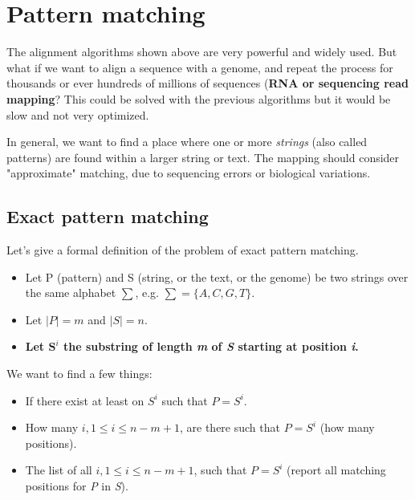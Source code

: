 \documentclass[../main.tex]{subfiles}
\begin{document}
\section{Pattern matching}

The alignment algorithms shown above are very powerful and widely used. But what if we want to align a sequence with a genome, and repeat the process for thousands or ever hundreds of millions of sequences (\textbf{RNA or sequencing read mapping}? This could be solved with the previous algorithms but it would be slow and not very optimized.

In general, we want to find a place where one or more \emph{strings} (also called patterns) are found within a larger string or text. The mapping should consider "approximate" matching, due to sequencing errors or biological variations.

\subsection{Exact pattern matching}
Let's give a formal definition of the problem of exact pattern matching.
\begin{itemize}
    \item Let P (pattern) and S (string, or the text, or the genome) be two strings over the same alphabet $\sum$, e.g. $\sum = \{A, C, G , T\}$.

    \item Let $|P|=m$ and $|S|=n$.
    \item \textbf{Let $\bm S^i$ the substring of length \emph{m} of \emph{S} starting at position \emph{i}.}
\end{itemize}

We want to find a few things:
\begin{itemize}
    \item If there exist at least on $S^i$ such that $P = S^i$.
    \item How many $i, 1 \leq i \leq n -m + 1$, are there such that $P=S^i$ (how many positions).
    \item The list of all $i, 1 \leq i \leq n -m + 1$, such that $P=S^i$ (report all matching positions for \emph{P} in \emph{S}).
\end{itemize}
\end{document}
